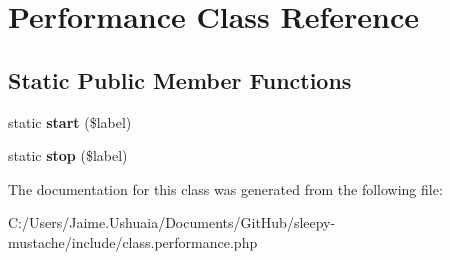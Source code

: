\hypertarget{class_performance}{\section{Performance Class Reference}
\label{class_performance}
}
\subsection*{Static Public Member Functions}
\begin{DoxyCompactItemize}
\item 
\hypertarget{class_performance_a1f9e601dc116eccc60485bab6079b705}{static {\bfseries start} (\$label)}\label{class_performance_a1f9e601dc116eccc60485bab6079b705}

\item 
\hypertarget{class_performance_aede39ba61c77f5b8458f3fcaafe48ab9}{static {\bfseries stop} (\$label)}\label{class_performance_aede39ba61c77f5b8458f3fcaafe48ab9}

\end{DoxyCompactItemize}


The documentation for this class was generated from the following file\-:\begin{DoxyCompactItemize}
\item 
C\-:/\-Users/\-Jaime.\-Ushuaia/\-Documents/\-Git\-Hub/sleepy-\/mustache/include/class.\-performance.\-php\end{DoxyCompactItemize}
